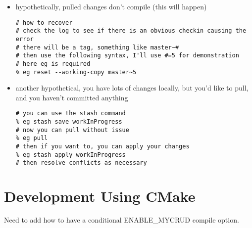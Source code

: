 \documentclass[pdf,12pt,report,strict]{SANDreport}
\theoremstyle{remark}
\begin{document}
\begin{itemize}
\item hypothetically, pulled changes don't compile (this will happen)
\begin{verbatim}
# how to recover
# check the log to see if there is an obvious checkin causing the error
# there will be a tag, something like master~#
# then use the following syntax, I'll use #=5 for demonstration
# here eg is required
% eg reset --working-copy master~5
\end{verbatim}

\item another hypothetical, you have lots of changes locally, but
  you'd like to pull, and you haven't committed anything
\begin{verbatim}
# you can use the stash command
% eg stash save workInProgress
# now you can pull without issue
% eg pull
# then if you want to, you can apply your changes
% eg stash apply workInProgress
# then resolve conflicts as necessary
\end{verbatim}
\end{itemize}

\section{Development Using CMake}

Need to add how to have a
conditional ENABLE\_MYCRUD compile option.
\end{document}

